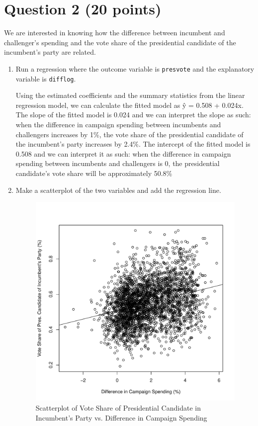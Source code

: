 \documentclass[12pt,letterpaper]{article}
\begin{document}
\section*{Question 2 (20 points)}
\noindent We are interested in knowing how the difference between incumbent and challenger's spending and the vote share of the presidential candidate of the incumbent's party are related.	\vspace{.25cm}
	\begin{enumerate}
		
		\item Run a regression where the outcome variable is \texttt{presvote} and the explanatory variable is \texttt{difflog}.
		
		 
		
		Using the estimated coefficients and the summary statistics from the linear regression model, we can calculate the fitted model as \^{y} = 0.508 + 0.024x. The slope of the fitted model is 0.024 and we can interpret the slope as such: when the difference in campaign spending between incumbents and challengers increases by 1\%, the vote share of the presidential candidate of the incumbent's party increases by 2.4\%. The intercept of the fitted model is 0.508 and we can interpret it as such: when the difference in campaign spending between incumbents and challengers is 0, the presidential candidate's vote share will be approximately 50.8\%
		
		\item Make a scatterplot of the two variables and add the regression line. 
		
			\begin{figure} [h]
			\centering
			\includegraphics[width=0.7\linewidth]{plotq2.pdf}
			\caption{Scatterplot of Vote Share of Presidential Candidate in Incumbent's Party vs. Difference in Campaign Spending}
			\label{fig:graph2}
		\end{figure}
	

\end{enumerate}
\end{document}
